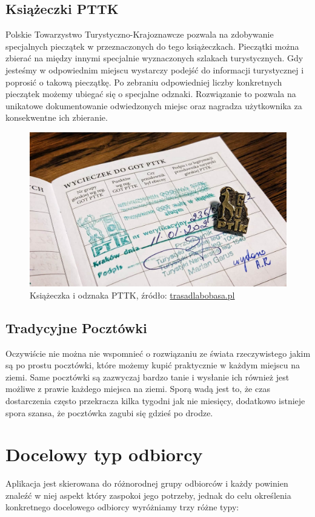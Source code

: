 \documentclass[a4paper,twoside,12pt]{book}
\begin{document}
\subsection{Książeczki PTTK}
Polskie Towarzystwo Turystyczno-Krajoznawcze pozwala na zdobywanie specjalnych pieczątek w przeznaczonych do tego książeczkach. Pieczątki można zbierać na między innymi specjalnie wyznaczonych szlakach turystycznych. Gdy jesteśmy w odpowiednim miejscu wystarczy podejść do informacji turystycznej i poprosić o takową pieczątkę. Po zebraniu odpowiedniej liczby konkretnych pieczątek możemy ubiegać się o specjalne odznaki. Rozwiązanie to pozwala na unikatowe dokumentowanie odwiedzonych miejsc oraz nagradza użytkownika za konsekwentne ich zbieranie.
\begin{figure}[H]
    \centering
    \includegraphics[width=1\textwidth]{apki_ss/pttk.jpg}
    \captionsetup{justification=centering}
    \caption{Książeczka i odznaka PTTK, źródło: \href{https://www.trasadlabobasa.pl/tab/artykul/jak\_zdobyc\_odznaki\_pttk/348}{trasadlabobasa.pl}}
\end{figure}

\subsection{Tradycyjne Pocztówki}
Oczywiście nie można nie wspomnieć o rozwiązaniu ze świata rzeczywistego jakim są po prostu pocztówki, które możemy kupić praktycznie w każdym miejscu na ziemi. Same pocztówki są zazwyczaj bardzo tanie i wysłanie ich również jest możliwe z prawie każdego miejsca na ziemi. Sporą wadą jest to, że czas dostarczenia często przekracza kilka tygodni jak nie miesięcy, dodatkowo istnieje spora szansa, że pocztówka zagubi się gdzieś po drodze.

\newpage
\section{Docelowy typ odbiorcy}
Aplikacja jest skierowana do różnorodnej grupy odbiorców i każdy powinien znaleźć w niej aspekt który zaspokoi jego potrzeby, jednak do celu określenia konkretnego docelowego odbiorcy wyróżniamy trzy różne typy:
\end{document}
